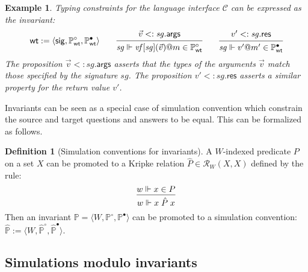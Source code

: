 \documentclass[11pt,oneside,draft]{book}
\newtheorem{example}[theorem]{Example}
\theoremstyle{definition}
\newtheorem{definition}[theorem]{Definition}
\newcommand{\kw}[1]{\ensuremath{ \mathsf{#1} }}
\newcommand{\que}{\circ}         %
\newcommand{\ans}{\bullet}       %
\begin{document}
\begin{example} \label{ex:wt} %
Typing constraints for the language interface $\mathcal{C}$
can be expressed as the invariant:
\[
  \kw{wt} :=
    \langle
      \kw{sig},
      \mathbb{P}_\kw{wt}^\que,
      \mathbb{P}_\kw{wt}^\ans
    \rangle
  \qquad
  \begin{prooftree}
    \hypo{\vec{v} <: \mathit{sg}.\kw{args}}
    \infer1{\mathit{sg} \Vdash
      \mathit{vf}[\mathit{sg}](\vec{v})@m \in \mathbb{P}_\kw{wt}^\que}
  \end{prooftree}
  \qquad
  \begin{prooftree}
    \hypo{v' <: \mathit{sg}.\kw{res}}
    \infer1{\mathit{sg} \Vdash
      v'@m' \in \mathbb{P}_\kw{wt}^\ans}
  \end{prooftree}
\]
The proposition $\vec{v} <: \mathit{sg}.\kw{args}$
asserts that the types of the arguments $\vec{v}$
match those specified by the signature $\mathit{sg}$.
The proposition $v' <: \mathit{sg}.\kw{res}$
asserts a similar property for the return value $v'$.
\end{example}

Invariants can be seen as a special case of simulation convention
which constrain the source and target questions and answers
to be equal.
This can be formalized as follows.

\begin{definition}[Simulation conventions for invariants]
A $W$-indexed predicate $P$ on a set $X$
can be promoted to a Kripke relation
$\hat{P} \in \mathcal{R}_W(X, X)$
defined by the rule:
\[
  \begin{prooftree}
    \hypo{w \Vdash x \in P}
    \infer1{w \Vdash x \mathrel{\hat{P}} x}
  \end{prooftree}
\]
Then an invariant
$\mathbb{P} = \langle W, \mathbb{P}^\que, \mathbb{P}^\ans \rangle$
can be promoted to a simulation convention:
$\hat{\mathbb{P}} :=
 \langle W, \hat{\mathbb{P}}^\que, \hat{\mathbb{P}}^\ans \rangle$.
\end{definition}


\subsection{Simulations modulo invariants} \label{sec:fsim-inv} %
\end{document}
